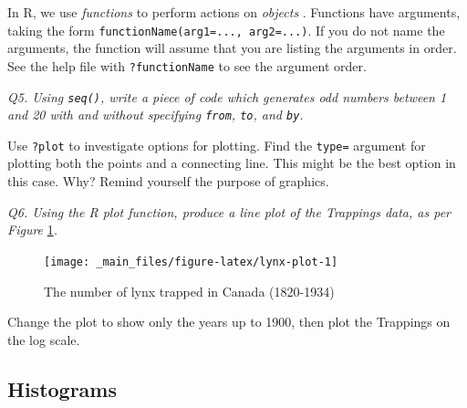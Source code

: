 \documentclass[
  11pt,
  a4paper,
]{book}
\newenvironment{Shaded}{\begin{snugshade}}{\end{snugshade}}
\newcommand{\CommentTok}[1]{\textcolor[rgb]{0.56,0.35,0.01}{\textit{#1}}}
\newcommand{\DecValTok}[1]{\textcolor[rgb]{0.00,0.00,0.81}{#1}}
\newcommand{\FunctionTok}[1]{\textcolor[rgb]{0.00,0.00,0.00}{#1}}
\newcommand{\NormalTok}[1]{#1}
\newcommand{\OtherTok}[1]{\textcolor[rgb]{0.56,0.35,0.01}{#1}}
\newcommand{\SpecialCharTok}[1]{\textcolor[rgb]{0.00,0.00,0.00}{#1}}
\newcommand{\StringTok}[1]{\textcolor[rgb]{0.31,0.60,0.02}{#1}}
\begin{document}
In R, we use \emph{functions} to perform actions on \emph{objects} . Functions have arguments, taking the form \texttt{functionName(arg1=...,\ arg2=...)}. If you do not name the arguments, the function will assume that you are listing the arguments in order. See the help file with \texttt{?functionName} to see the argument order.

\emph{Q5. Using \texttt{seq()}, write a piece of code which generates odd numbers between 1 and 20 with and without specifying \texttt{from}, \texttt{to}, and \texttt{by}.}

\begin{Shaded}
\end{Shaded}

Use \texttt{?plot} to investigate options for plotting. Find the \texttt{type=} argument for plotting both the points and a connecting line. This might be the best option in this case. Why? Remind yourself the purpose of graphics.

\emph{Q6. Using the R plot function, produce a line plot of the Trappings data, as per Figure} \ref{fig:lynx-plot}\emph{.}

\begin{figure}

{\centering \texttt{[image: \_main\_files/figure-latex/lynx-plot-1]} 

}

\caption{The number of lynx trapped in Canada (1820-1934)}\label{fig:lynx-plot}
\end{figure}

Change the plot to show only the years up to 1900, then plot the Trappings on the log scale.

\hypertarget{histograms}{%
\subsection{Histograms}\label{histograms}}
\end{document}
